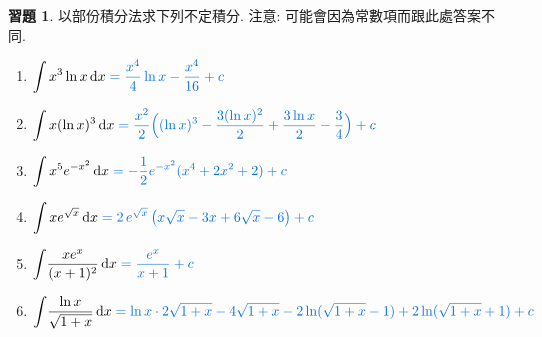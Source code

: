\documentclass[12pt]{extarticle}
\newcommand{\ds}{\displaystyle}
\theoremstyle{definition}
\newtheorem*{exe}{習題}
\begin{document}
\begin{exe} 以部份積分法求下列不定積分. 注意: 可能會因為常數項而跟此處答案不同. 
  \begin{enumerate}\setlength{\itemsep}{0pt}
    \item $\ds\int x^3\ln x\,\mathrm{d}x {\color{C2}\;= \frac{x^4}{4}\ln x -\frac{x^4}{16} + c}$
    \item $\ds\int x(\ln x)^3\,\mathrm{d}x {\color{C2}\;= \frac{x^2}{2}\Big((\ln x)^3 -\frac{3(\ln x)^2}{2} + \frac{3\ln x}{2} - \frac{3}{4} \Big) + c}$
    \item $\ds\int x^5 e^{-x^2}\,\mathrm{d}x {\color{C2}\;= -\frac{1}{2}e^{-x^2}(x^4 + 2x^2 + 2) + c}$
    \item $\ds\int x e^{\sqrt{x}}\,\mathrm{d}x {\color{C2}\;= 2\,e^{\sqrt{x}}\,\big(x\sqrt{x} - 3x + 6\sqrt{x} - 6\big) + c}$
    \item $\ds\int\!\frac{x e^x}{(x + 1)^2}\,\mathrm{d}x {\color{C2}\;= \frac{e^x}{x + 1} + c}  $
    \item $\ds\int\!\frac{\ln x}{\sqrt{1 + x}}\,\mathrm{d}x {\color{C2}\;= \ln x\cdot 2\sqrt{1 + x} - 4\sqrt{1+x} - 2\ln(\sqrt{1 + x}-1) + 2\ln(\sqrt{1+x} + 1) + c}$
  \end{enumerate}
\end{exe}
\end{document}
